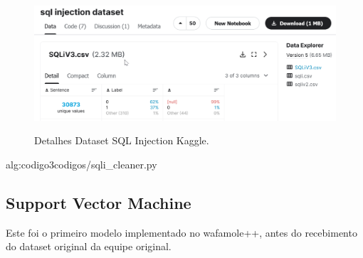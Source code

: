 \begin{figure}[ht]
    \centering
    \caption{Detalhes Dataset SQL Injection Kaggle.}
    \includegraphics[width=16cm]{figuras/sqlInjectionDataset.png} 
    \label{fig:internet} 
\end{figure}

\label{sec:codigos:sqli_cleaner}
 {alg:codigo3}{codigos/sqli_cleaner.py}
\bigskip


\subsection{Support Vector Machine}
Este foi o primeiro modelo implementado no wafamole++, antes do recebimento do dataset original da equipe original. 





